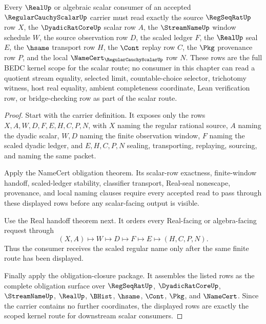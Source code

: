 \begin{theorem}
\label{thm:regular-cauchy-scalar-scoped-consumer-route}
Every $\RealUp$ or algebraic scalar consumer of an accepted $\RegularCauchyScalarUp$ carrier must read exactly the source $\RegSeqRatUp$ row $X$, the $\DyadicRatCoreUp$ scalar row $A$, the $\StreamNameUp$ window schedule $W$, the source observation row $D$, the scaled ledger $F$, the $\RealUp$ seal $E$, the $\hsame$ transport row $H$, the $\Cont$ replay row $C$, the $\Pkg$ provenance row $P$, and the local $\NameCert_{\RegularCauchyScalarUp}$ row $N$. These rows are the full BEDC kernel scope for the scalar route; no consumer in this chapter can read a quotient stream equality, selected limit, countable-choice selector, trichotomy witness, host real equality, ambient completeness coordinate, Lean verification row, or bridge-checking row as part of the scalar route.
\end{theorem}
\begin{proof}
Start with the carrier definition. It exposes only the rows $X,A,W,D,F,E,H,C,P,N$, with $X$ naming the regular rational source, $A$ naming the dyadic scalar, $W,D$ naming the finite observation window, $F$ naming the scaled dyadic ledger, and $E,H,C,P,N$ sealing, transporting, replaying, sourcing, and naming the same packet.

Apply the NameCert obligation theorem. Its scalar-row exactness, finite-window handoff, scaled-ledger stability, classifier transport, Real-seal nonescape, provenance, and local naming clauses require every accepted read to pass through these displayed rows before any scalar-facing output is visible.

Use the Real handoff theorem next. It orders every Real-facing or algebra-facing request through
$$
(X,A)\longmapsto W\longmapsto D\longmapsto F\longmapsto E\longmapsto(H,C,P,N).
$$
Thus the consumer receives the scaled regular name only after the same finite route has been displayed.

Finally apply the obligation-closure package. It assembles the listed rows as the complete obligation surface over $\RegSeqRatUp$, $\DyadicRatCoreUp$, $\StreamNameUp$, $\RealUp$, $\BHist$, $\hsame$, $\Cont$, $\Pkg$, and $\NameCert$. Since the carrier contains no further coordinates, the displayed rows are exactly the scoped kernel route for downstream scalar consumers.
\end{proof}

